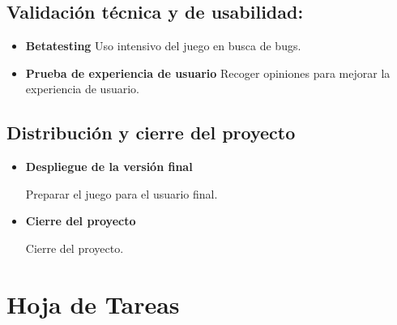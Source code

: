 \subsection{Validación técnica y de usabilidad:}

\begin{itemize}
	\item \textbf{Betatesting}
	Uso intensivo del juego en busca de bugs.
	\item \textbf{Prueba de experiencia de usuario}
	Recoger opiniones para mejorar la experiencia de usuario.
\end{itemize}

\subsection{Distribución y cierre del proyecto}

\begin{itemize}
	\item \textbf{Despliegue de la versión final}
	
	Preparar el juego para el usuario final.
	\item \textbf{Cierre del proyecto}

	Cierre del proyecto.
\end{itemize}

\section{Hoja de Tareas}


